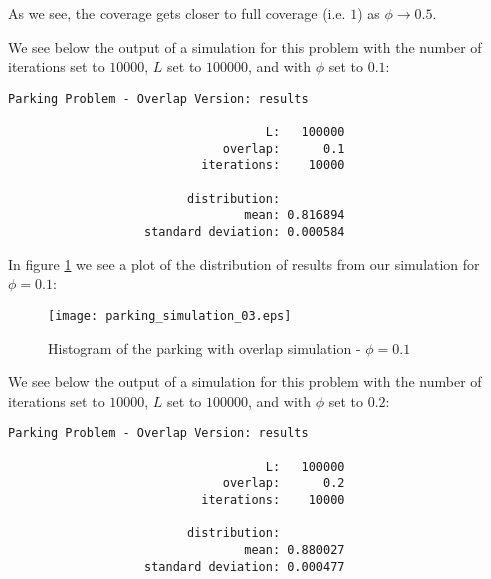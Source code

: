 As we see, the coverage gets closer to full coverage (i.e. $1$) 
as $\phi \to 0.5$. \bigskip

\newpage

We see below the output of a simulation for this problem with 
the number of iterations set to $10000$, $L$ set to $100000$, 
and with $\phi$ set to $0.1$: \bigskip

	\begin{lstlisting}[numbers=none]
    Parking Problem - Overlap Version: results

                                    L:   100000
                              overlap:      0.1
                           iterations:    10000

                         distribution:
                                 mean: 0.816894
                   standard deviation: 0.000584

	\end{lstlisting} \bigskip

In figure \ref{fig:ps3} we see a plot of the distribution 
of results from our simulation for $\phi = 0.1$: \bigskip

\begin{figure}[h!]
	\centering
	\texttt{[image: parking\_simulation\_03.eps]}
	\caption{Histogram of the parking with overlap simulation - $\phi = 0.1$}
	\label{fig:ps3}
\end{figure}\medskip

\newpage

We see below the output of a simulation for this 
problem with the number of iterations set to $10000$, 
$L$ set to $100000$, and with $\phi$ set to $0.2$: \bigskip

	\begin{lstlisting}[numbers=none]
    Parking Problem - Overlap Version: results
	
                                    L:   100000
                              overlap:      0.2
                           iterations:    10000
	
                         distribution:
                                 mean: 0.880027
                   standard deviation: 0.000477

	\end{lstlisting} \bigskip

